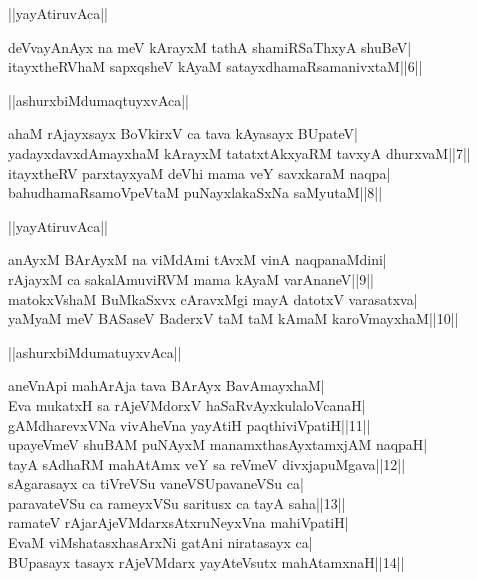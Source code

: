\documentclass{article}
\begin{document}
\begin{center}
||yayAtiruvAca||
\end{center}

deVvayAnAyx na meV kArayxM tathA shamiRSaThxyA shuBeV|\\
itayxtheRVhaM sapxqsheV kAyaM satayxdhamaRsamanivxtaM||6||\\

\begin{center}
||ashurxbiMdumaqtuyxvAca||
\end{center}

ahaM rAjayxsayx BoVkirxV ca tava kAyasayx BUpateV|\\
yadayxdavxdAmayxhaM kArayxM tatatxtAkxyaRM tavxyA dhurxvaM||7||\\
itayxtheRV parxtayxyaM deVhi mama veY savxkaraM naqpa|\\
bahudhamaRsamoVpeVtaM puNayxlakaSxNa saMyutaM||8||\\

\begin{center}
||yayAtiruvAca||
\end{center}

anAyxM BArAyxM na viMdAmi tAvxM vinA naqpanaMdini|\\
rAjayxM ca sakalAmuviRVM mama kAyaM varAnaneV||9||\\
matokxVshaM BuMkaSxvx cAravxMgi mayA datotxV varasatxva|\\
yaMyaM meV BASaseV BaderxV taM taM kAmaM karoVmayxhaM||10||\\

\begin{center}
||ashurxbiMdumatuyxvAca||
\end{center}

aneVnApi mahArAja tava BArAyx BavAmayxhaM|\\
Eva mukatxH sa rAjeVMdorxV haSaRvAyxkulaloVcanaH|\\
gAMdharevxVNa vivAheVna yayAtiH paqthiviVpatiH||11||\\
upayeVmeV shuBAM puNAyxM manamxthasAyxtamxjAM naqpaH|\\
tayA sAdhaRM mahAtAmx veY sa reVmeV divxjapuMgava||12||\\
sAgarasayx ca tiVreVSu vaneVSUpavaneVSu ca|\\
paravateVSu ca rameyxVSu saritusx ca tayA saha||13||\\
ramateV rAjarAjeVMdarxsAtxruNeyxVna mahiVpatiH|\\
EvaM viMshatasxhasArxNi gatAni niratasayx ca|\\
BUpasayx tasayx rAjeVMdarx yayAteVsutx mahAtamxnaH||14||\\
\end{document}
